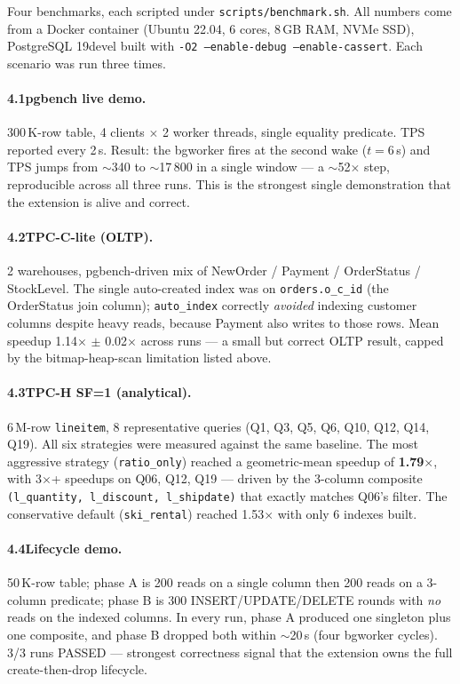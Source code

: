 \documentclass[10pt,a4paper]{article}
\newcommand{\code}[1]{\texttt{\small #1}}
\begin{document}
Four benchmarks, each scripted under \code{scripts/benchmark.sh}. All
numbers come from a Docker container (Ubuntu 22.04, 6 cores, 8\,GB
RAM, NVMe SSD), PostgreSQL 19devel built with \code{-O2
--enable-debug --enable-cassert}. Each scenario was run three times.

\paragraph{4.1\quad pgbench live demo.} 300\,K-row table, 4 clients
$\times$ 2 worker threads, single equality predicate. TPS reported
every 2\,s. Result: the bgworker fires at the second wake (\(t=6\)\,s)
and TPS jumps from $\sim$340 to $\sim$17\,800 in a single window
--- a $\sim$52$\times$ step, reproducible across all three runs.
This is the strongest single demonstration that the extension is
alive and correct.

\paragraph{4.2\quad TPC-C-lite (OLTP).} 2 warehouses, pgbench-driven
mix of NewOrder / Payment / OrderStatus / StockLevel. The single
auto-created index was on \code{orders.o\_c\_id} (the OrderStatus
join column); \code{auto\_index} correctly \emph{avoided} indexing
customer columns despite heavy reads, because Payment also writes to
those rows. Mean speedup 1.14$\times$ $\pm$ 0.02$\times$ across runs
--- a small but correct OLTP result, capped by the bitmap-heap-scan
limitation listed above.

\paragraph{4.3\quad TPC-H SF=1 (analytical).} 6\,M-row \code{lineitem},
8 representative queries (Q1, Q3, Q5, Q6, Q10, Q12, Q14, Q19). All
six strategies were measured against the same baseline. The most
aggressive strategy (\code{ratio\_only}) reached a geometric-mean
speedup of \textbf{1.79$\times$}, with 3$\times$+ speedups on Q06,
Q12, Q19 --- driven by the 3-column composite \code{(l\_quantity,
l\_discount, l\_shipdate)} that exactly matches Q06's filter. The
conservative default (\code{ski\_rental}) reached 1.53$\times$ with
only 6 indexes built.

\paragraph{4.4\quad Lifecycle demo.} 50\,K-row table; phase A is 200
reads on a single column then 200 reads on a 3-column predicate;
phase B is 300 INSERT/UPDATE/DELETE rounds with \emph{no} reads on
the indexed columns. In every run, phase A produced one singleton
plus one composite, and phase B dropped both within $\sim$20\,s
(four bgworker cycles). 3/3 runs PASSED --- strongest correctness
signal that the extension owns the full create-then-drop lifecycle.
\end{document}
